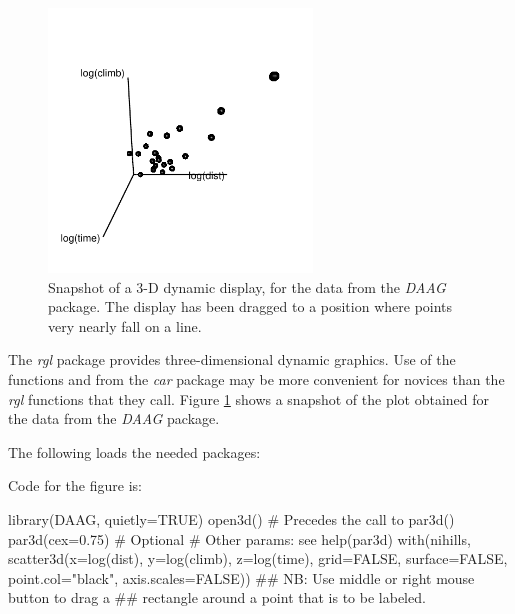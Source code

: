 \begin{figure}
\begin{Schunk}


\centerline{\includegraphics[width=0.625\textwidth]{figs/07-rgl-demo-1} }

\end{Schunk}
\caption{Snapshot of a 3-D dynamic display, for the 
data from the {\em DAAG} package.  The display has been dragged to a
position where points very nearly fall on a line.}\label{fig:rgl-ex}
\end{figure}

The \textit{rgl} package provides three-dimensional dynamic graphics.
Use of the functions  and  from
the \emph{car} package may be more convenient for novices than the
\emph{rgl} functions that they call.
Figure \ref{fig:rgl-ex} shows a snapshot of the plot obtained for the
 data from the {\em DAAG} package.

\noindent
The following loads the needed packages:
\begin{Schunk}
\end{Schunk}

\noindent Code for the figure is:
\begin{Schunk}
\begin{Sinput}
library(DAAG, quietly=TRUE)
open3d()            # Precedes the call to par3d()
par3d(cex=0.75)     # Optional
                    # Other params: see help(par3d)
with(nihills, scatter3d(x=log(dist), y=log(climb),
                        z=log(time),
                        grid=FALSE,
                        surface=FALSE,
                        point.col="black",
                        axis.scales=FALSE))
## NB: Use middle or right mouse button to drag a
## rectangle around a point that is to be labeled.
\end{Sinput}
\end{Schunk}

